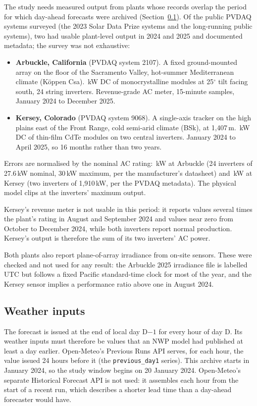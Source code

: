 \documentclass[11pt]{article}
\begin{document}
The study needs measured output from plants whose records overlap the period for which day-ahead forecasts were archived (Section~\ref{sec:weather}). Of the public PVDAQ systems surveyed (the 2023 Solar Data Prize systems and the long-running public systems), two had usable plant-level output in 2024 and 2025 and documented metadata; the survey was not exhaustive:

\begin{itemize}
\item \textbf{Arbuckle, California} (PVDAQ system 2107). A fixed ground-mounted array on the floor of the Sacramento Valley, hot-summer Mediterranean climate (K\"oppen Csa). \ArbDcKw\,kW DC of monocrystalline modules at 25$^\circ$ tilt facing south, 24 string inverters. Revenue-grade AC meter, 15-minute samples, January 2024 to December 2025.
\item \textbf{Kersey, Colorado} (PVDAQ system 9068). A single-axis tracker on the high plains east of the Front Range, cold semi-arid climate (BSk), at 1,407\,m. \KerDcKw\,kW DC of thin-film CdTe modules on two central inverters. January 2024 to April 2025, so 16 months rather than two years.
\end{itemize}

Errors are normalised by the nominal AC rating: \ArbAcKw\,kW at Arbuckle (24 inverters of 27.6\,kW nominal, 30\,kW maximum, per the manufacturer's datasheet) and \KerAcKw\,kW at Kersey (two inverters of 1,910\,kW, per the PVDAQ metadata). The physical model clips at the inverters' maximum output.

Kersey's revenue meter is not usable in this period: it reports values several times the plant's rating in August and September 2024 and values near zero from October to December 2024, while both inverters report normal production. Kersey's output is therefore the sum of its two inverters' AC power.

Both plants also report plane-of-array irradiance from on-site sensors. These were checked and not used for any result: the Arbuckle 2025 irradiance file is labelled UTC but follows a fixed Pacific standard-time clock for most of the year, and the Kersey sensor implies a performance ratio above one in August 2024.

\subsection{Weather inputs}\label{sec:weather}

The forecast is issued at the end of local day D$-1$ for every hour of day D. Its weather inputs must therefore be values that an NWP model had published at least a day earlier. Open-Meteo's Previous Runs API serves, for each hour, the value issued 24 hours before it (the \texttt{previous\_day1} series). This archive starts in January 2024, so the study window begins on 20 January 2024. Open-Meteo's separate Historical Forecast API is not used: it assembles each hour from the start of a recent run, which describes a shorter lead time than a day-ahead forecaster would have.
\end{document}
